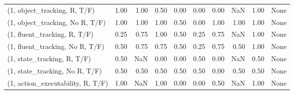 \begin{table*}[h!]
\begin{adjustbox}{width=2\columnwidth,center}
\begin{tabular}{lrrr|rrr|rrr}
\midrule
(1, object\_tracking, R, T/F)         &                      1.00 &                  1.00 &                      0.50 &                          0.00 &                      0.00 &                          0.00 &                                    NaN &                               1.00 &                                  None \\
(1, object\_tracking, No R, T/F)      &                      1.00 &                  1.00 &                      1.00 &                          0.50 &                      0.00 &                          1.00 &                                   1.00 &                               1.00 &                                  None \\
(1, fluent\_tracking, R, T/F)         &                      0.25 &                  0.75 &                      1.00 &                          0.50 &                      0.25 &                          0.75 &                                    NaN &                               1.00 &                                  None \\
(1, fluent\_tracking, No R, T/F)      &                      0.50 &                  0.75 &                      0.75 &                          0.50 &                      0.25 &                          0.75 &                                   0.50 &                               1.00 &                                  None \\
(1, state\_tracking, R, T/F)          &                      0.50 &                   NaN &                      0.00 &                          0.00 &                      0.50 &                          0.00 &                                    NaN &                               0.50 &                                  None \\
(1, state\_tracking, No R, T/F)       &                      0.50 &                  0.50 &                      0.50 &                          0.50 &                      0.50 &                          0.00 &                                   0.50 &                               0.50 &                                  None \\
(1, action\_executability, R, T/F)    &                      1.00 &                   NaN &                      1.00 &                          0.00 &                      0.00 &                          0.50 &                                    NaN &                               1.00 &                                  None \\

\end{tabular}
\end{adjustbox}
\end{table*}
